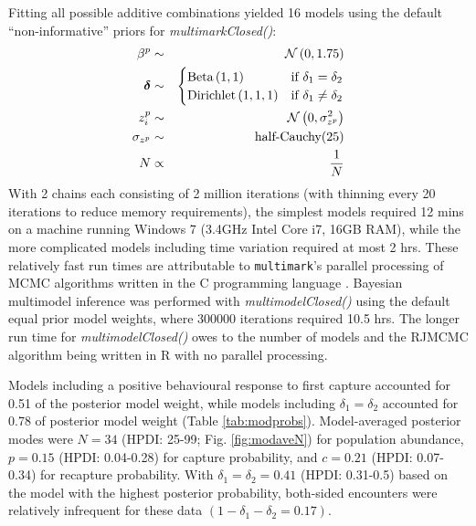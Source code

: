 \documentclass[12pt]{article}
\begin{document}
Fitting all possible additive combinations yielded 16 models using the default ``non-informative'' priors for \textit{multimarkClosed()}:
\begin{eqnarray*}
  \beta^p & \sim & {\cal N} \left( 0, 1.75 \right) \\
  \boldsymbol{\delta} & \sim & \begin{cases}
                                  \text{Beta} \left( 1, 1 \right) & \text{if } \delta_1 = \delta_2 \\
                                  \text{Dirichlet} \left( 1, 1, 1 \right) & \text{if } \delta_1 \ne \delta_2
                               \end{cases} \\
  z^p_i & \sim & {\cal N} \left( 0, \sigma^2_{z^p} \right) \\
  \sigma_{z^p} & \sim & \text{half-Cauchy}(25)\\
  N & \propto & \frac{1}{N}
\end{eqnarray*}
With 2 chains each consisting of 2 million iterations (with thinning every 20 iterations to reduce memory requirements), the simplest models required 12 mins on a machine running Windows 7 (3.4GHz Intel Core i7, 16GB RAM), while the more complicated models including time variation required at most 2 hrs. These relatively fast run times are attributable to \verb|multimark|'s parallel processing of MCMC algorithms written in the C programming language \citep{KernighanRitchie1988}. Bayesian multimodel inference was performed with \textit{multimodelClosed()} using the default equal prior model weights, where 300000 iterations required 10.5 hrs. The longer run time for \textit{multimodelClosed()} owes to the number of models and the RJMCMC algorithm being written in R with no parallel processing.

Models including a positive behavioural response to first capture accounted for 0.51 of the posterior model weight, while models including $\delta_1=\delta_2$ accounted for 0.78 of posterior model weight (Table \ref{tab:modprobs}). Model-averaged posterior modes were $N=34$ (HPDI: 25-99; Fig. \ref{fig:modaveN}) for population abundance, $p=0.15$ (HPDI: 0.04-0.28) for capture probability, and $c=0.21$ (HPDI: 0.07-0.34) for recapture probability. With $\delta_1=\delta_2=0.41$ (HPDI: 0.31-0.5) based on the model with the highest posterior probability, both-sided encounters were relatively infrequent for these data $(1-\delta_1-\delta_2=0.17)$.
\end{document}
